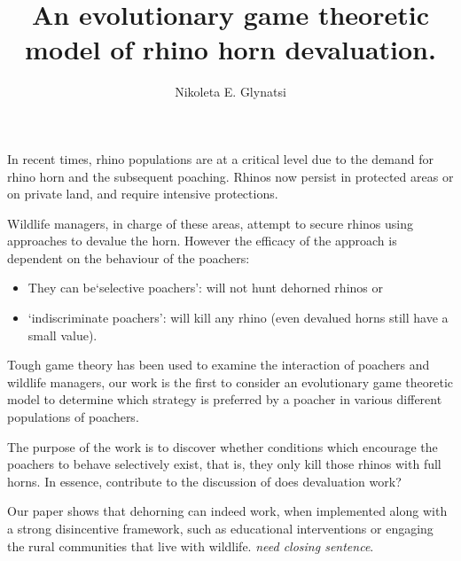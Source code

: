 \documentclass{article}
\title{An evolutionary game theoretic model of rhino horn devaluation.}
\date{}
\author{Nikoleta E. Glynatsi}
\begin{document}
\maketitle

In recent times, rhino populations are at a critical level due to the demand for rhino
horn and the subsequent poaching. Rhinos now persist in protected areas or on private
land, and require intensive protections.

Wildlife managers, in charge of these areas, attempt to secure rhinos using approaches
to devalue the horn. However the efficacy of the approach is dependent on the behaviour of the poachers:

\begin{itemize}
    \item They can be`selective poachers’: will not hunt dehorned rhinos or
    \item `indiscriminate poachers’: will kill any rhino (even devalued horns still have a small value).
\end{itemize}

Tough game theory has been used to examine the interaction of poachers and wildlife managers,
our work is the first to consider an evolutionary game theoretic model to determine which
strategy is preferred by a poacher in various different populations of poachers. 

The purpose of the work is to discover whether conditions which encourage the poachers
to behave selectively exist, that is, they only kill those rhinos with full horns.
In essence, contribute to the discussion of does devaluation work?

Our paper shows that dehorning can indeed work, when implemented along with a strong
disincentive framework, such as educational interventions or engaging the rural communities
that live with wildlife. \textit{need closing sentence}.
\end{document}
